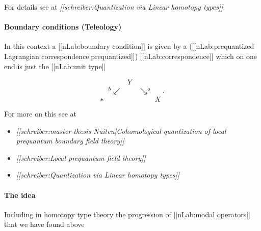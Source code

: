 \documentclass[12pt,titlepage]{article}
\def\mathllap{\mathpalette\mathllapinternal}
\def\mathrlap{\mathpalette\mathrlapinternal}
\def\mathllapinternal#1#2{\llap{$\mathsurround=0pt#1{#2}$}}
\def\mathrlapinternal#1#2{\rlap{$\mathsurround=0pt#1{#2}$}}
\newcommand{\itexarray}[1]{\begin{matrix}#1\end{matrix}}
\theoremstyle{plain}
\theoremstyle{definition}
\theoremstyle{remark}
\begin{document}
For details see at \emph{[[schreiber:Quantization via Linear homotopy types]]}.

\hypertarget{boundary_conditions_teleology}{}\paragraph*{{Boundary conditions (Teleology)}}\label{boundary_conditions_teleology}

In this context a [[nLab:boundary condition]] is given by a ([[nLab:prequantized Lagrangian correspondence|prequantized]]) [[nLab:correspondence]] which on one end is just the [[nLab:unit type]]

\begin{displaymath}
\itexarray{
    && Y
    \\
    & {}^{\mathllap{b}}\swarrow && \searrow^{\mathrlap{o}}
    \\
    \ast && && X
  }
  \,.
\end{displaymath}
For more on this see at

\begin{itemize}%
\item \emph{[[schreiber:master thesis Nuiten|Cohomological quantization of local prequantum boundary field theory]]}


\item \emph{[[schreiber:Local prequantum field theory]]}


\item \emph{[[schreiber:Quantization via Linear homotopy types]]}



\end{itemize}
\hypertarget{TheIdea}{}\paragraph*{{The idea}}\label{TheIdea}

Including in homotopy type theory the progression of [[nLab:modal operators]] that we have found above
\end{document}
